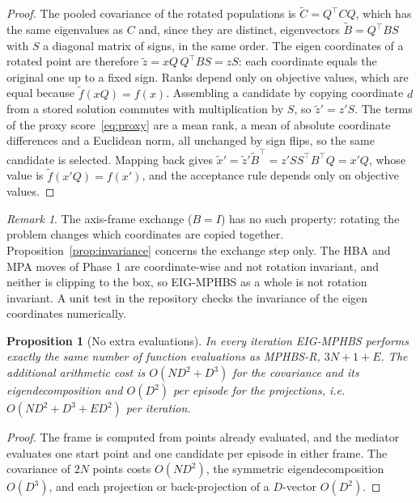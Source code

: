 \documentclass[preprint,12pt,authoryear]{elsarticle}
\newtheorem{proposition}{Proposition}
\theoremstyle{remark}
\newtheorem{remark}{Remark}
\begin{document}
\begin{proof}
The pooled covariance of the rotated populations is $\tilde C=Q^\top CQ$, which has the same eigenvalues as $C$ and,
since they are distinct, eigenvectors $\tilde B=Q^\top BS$ with $S$ a diagonal matrix of signs, in the same order. The
eigen coordinates of a rotated point are therefore $\tilde z = xQ\,Q^\top BS = zS$: each coordinate equals the original
one up to a fixed sign. Ranks depend only on objective values, which are equal because $\tilde f(xQ)=f(x)$. Assembling a
candidate by copying coordinate $d$ from a stored solution commutes with multiplication by $S$, so $\tilde z'=z'S$.
The terms of the proxy score~\eqref{eq:proxy} are a mean rank, a mean of absolute coordinate differences and a
Euclidean norm, all unchanged by sign flips, so the same candidate is selected. Mapping back gives
$\tilde x'=\tilde z'\tilde B^\top = z'SS^\top B^\top Q = x'Q$, whose value is $\tilde f(x'Q)=f(x')$, and the
acceptance rule depends only on objective values.
\end{proof}

\begin{remark}
The axis-frame exchange ($B=I$) has no such property: rotating the problem changes which coordinates are copied
together. Proposition~\ref{prop:invariance} concerns the exchange step only. The HBA and MPA moves of Phase 1 are
coordinate-wise and not rotation invariant, and neither is clipping to the box, so EIG-MPHBS as a whole is not
rotation invariant. A unit test in the repository checks the invariance of the eigen coordinates numerically.
\end{remark}

\begin{proposition}[No extra evaluations]
\label{prop:cost}
In every iteration EIG-MPHBS performs exactly the same number of function evaluations as MPHBS-R, $3N+1+E$. The
additional arithmetic cost is $O(ND^2+D^3)$ for the covariance and its eigendecomposition and $O(D^2)$ per episode for
the projections, i.e.\ $O(ND^2+D^3+ED^2)$ per iteration.
\end{proposition}

\begin{proof}
The frame is computed from points already evaluated, and the mediator evaluates one start point and one candidate per
episode in either frame. The covariance of $2N$ points costs $O(ND^2)$, the symmetric eigendecomposition $O(D^3)$, and
each projection or back-projection of a $D$-vector $O(D^2)$.
\end{proof}
\end{document}
